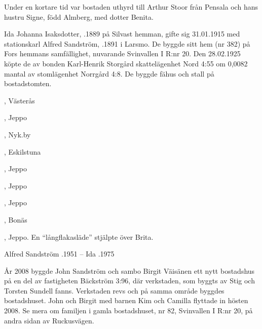 Under en kortare tid var bostaden uthyrd till Arthur Stoor från Pensala och hans hustru Signe, född Almberg, med dotter Benita.


Ida Johanna Isaksdotter, .1889 på Silvast hemman, gifte sig 31.01.1915 med stationskarl Alfred Sandström, .1891 i Larsmo. De byggde sitt hem (nr 382) på Fors hemmans samfällighet, nuvarande Svinvallen I R:nr 20. Den 28.02.1925 köpte de av bonden Karl-Henrik Storgård skattelägenhet Nord 4:55 om 0,0082 mantal av stomlägenhet Norrgård 4:8. De byggde fähus och stall på bostadstomten.
\begin{jhchildren}
  \item {}, Västerås
  \item {}, Jeppo
  \item {}, Nyk.by
  \item {}, Eskilstuna
  \item {}, Jeppo
  \item {}, Jeppo
  \item {}, Jeppo
  \item {}
  \item {}, Bonäs
  \item {}, Jeppo. En ``långflakasläde'' stjälpte över Brita.
\end{jhchildren}


Alfred Sandström .1951  --  Ida .1975



År 2008 byggde John Sandström och sambo Birgit Väisänen ett nytt bostadshus på en del av fastigheten Bäckström 3:96, där verkstaden, som byggts av Stig och Torsten Sundell fanns. Verkstaden revs och på 	samma område byggdes bostadshuset. John och Birgit med barnen Kim och Camilla flyttade in hösten 2008. Se mera om familjen i gamla bostadshuset, nr 82, Svinvallen I R:nr 20, på andra sidan av Ruckusvägen.




